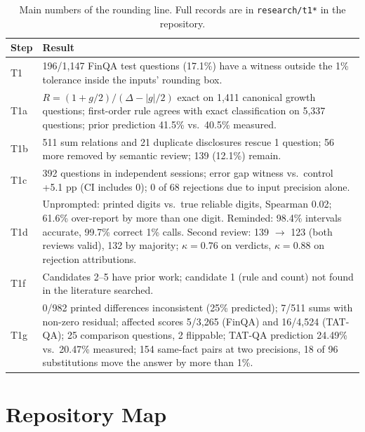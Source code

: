\documentclass[11pt]{article}
\begin{document}
\begin{table}[H]
\centering
\scriptsize
\renewcommand{\arraystretch}{1.12}
\begin{tabular}{@{}L{1.1cm}L{5.7cm}@{}}
\toprule
\textbf{Step} & \textbf{Result} \\
\midrule
T1 & 196/1,147 FinQA test questions (17.1\%) have a witness outside the 1\% tolerance inside the inputs' rounding box. \\
T1a & $R=(1+g/2)/(\Delta-|g|/2)$ exact on 1,411 canonical growth questions; first-order rule agrees with exact classification on 5,337 questions; prior prediction 41.5\% vs.\ 40.5\% measured. \\
T1b & 511 sum relations and 21 duplicate disclosures rescue 1 question; 56 more removed by semantic review; 139 (12.1\%) remain. \\
T1c & 392 questions in independent sessions; error gap witness vs.\ control +5.1 pp (CI includes 0); 0 of 68 rejections due to input precision alone. \\
T1d & Unprompted: printed digits vs.\ true reliable digits, Spearman 0.02; 61.6\% over-report by more than one digit. Reminded: 98.4\% intervals accurate, 99.7\% correct 1\% calls. Second review: 139 $\to$ 123 (both reviews valid), 132 by majority; $\kappa=0.76$ on verdicts, $\kappa=0.88$ on rejection attributions. \\
T1f & Candidates 2--5 have prior work; candidate 1 (rule and count) not found in the literature searched. \\
T1g & 0/982 printed differences inconsistent (25\% predicted); 7/511 sums with non-zero residual; affected scores 5/3,265 (FinQA) and 16/4,524 (TAT-QA); 25 comparison questions, 2 flippable; TAT-QA prediction 24.49\% vs.\ 20.47\% measured; 154 same-fact pairs at two precisions, 18 of 96 substitutions move the answer by more than 1\%. \\
\bottomrule
\end{tabular}
\caption{Main numbers of the rounding line. Full records are in \texttt{research/t1*} in the repository.}
\end{table}

\section{Repository Map}
\label{app:repo}
\end{document}
